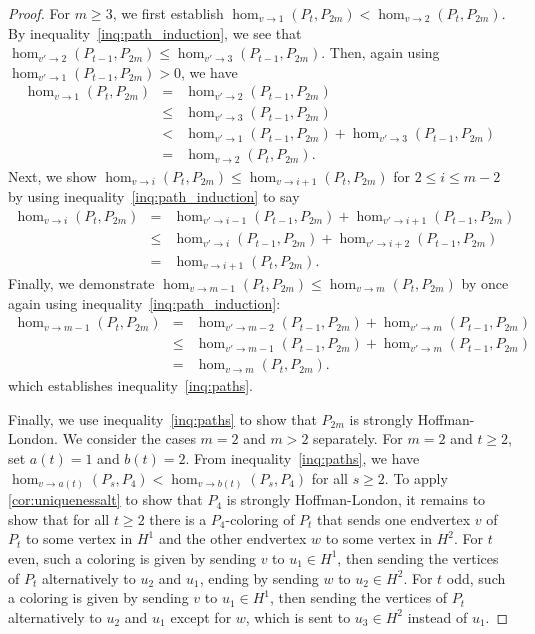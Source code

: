 \documentclass[11pt]{article}
\theoremstyle{definition}
\newcommand{\homclass}[4]{\hom_{#1\to#2}(#3,#4)}
\begin{document}
\begin{proof}
For $m \ge 3$, we first establish $\homclass{v}{1}{P_t}{P_{2m}} < \homclass{v}{2}{P_t}{P_{2m}}$. By inequality~\eqref{inq:path_induction}, we see that $\homclass{v'}{2}{P_{t-1}}{P_{2m}} \le \homclass{v'}{3}{P_{t-1}}{P_{2m}}$. Then, again using $\homclass{v'}{1}{P_{t-1}}{P_{2m}} > 0$, we have
\begin{eqnarray*}
\homclass{v}{1}{P_t}{P_{2m}} &=& \homclass{v'}{2}{P_{t-1}}{P_{2m}} \\
	&\le& \homclass{v'}{3}{P_{t-1}}{P_{2m}} \\
	&<& \homclass{v'}{1}{P_{t-1}}{P_{2m}} + \homclass{v'}{3}{P_{t-1}}{P_{2m}} \\
	&=& \homclass{v}{2}{P_t}{P_{2m}}.
\end{eqnarray*}
Next, we show $\homclass{v}{i}{P_t}{P_{2m}} \le \homclass{v}{i+1}{P_t}{P_{2m}}$ for $2 \le i \le m-2$ by using inequality~\eqref{inq:path_induction} to say
\begin{eqnarray*}
\homclass{v}{i}{P_t}{P_{2m}} &=& \homclass{v'}{i-1}{P_{t-1}}{P_{2m}} + \homclass{v'}{i+1}{P_{t-1}}{P_{2m}} \\
	&\le& \homclass{v'}{i}{P_{t-1}}{P_{2m}} + \homclass{v'}{i+2}{P_{t-1}}{P_{2m}} \\
	&=& \homclass{v}{i+1}{P_t}{P_{2m}}.
\end{eqnarray*}
Finally, we demonstrate $\homclass{v}{m-1}{P_t}{P_{2m}} \le \homclass{v}{m}{P_t}{P_{2m}}$ by once again using inequality~\eqref{inq:path_induction}:
\begin{eqnarray*}
\homclass{v}{m-1}{P_t}{P_{2m}} &=& \homclass{v'}{m-2}{P_{t-1}}{P_{2m}} + \homclass{v'}{m}{P_{t-1}}{P_{2m}} \\
	&\le& \homclass{v'}{m-1}{P_{t-1}}{P_{2m}} + \homclass{v'}{m}{P_{t-1}}{P_{2m}} \\
	&=& \homclass{v}{m}{P_t}{P_{2m}}.
\end{eqnarray*}
which establishes inequality~\eqref{inq:paths}.

Finally, we use inequality~\eqref{inq:paths} to show that $P_{2m}$ is strongly Hoffman-London. We consider the cases $m=2$ and $m > 2$ separately. For $m=2$ and $t \ge 2$, set $a(t)=1$ and $b(t)=2$. From inequality~\eqref{inq:paths}, we have $\homclass{v}{a(t)}{P_s}{P_{4}} < \homclass{v}{b(t)}{P_s}{P_{4}}$ for all $s \ge 2$. To apply \cref{cor:uniquenessalt} to show that $P_{4}$ is strongly Hoffman-London, it remains to show that for all $t \ge 2$ there is a $P_{4}$-coloring of $P_t$ that sends one endvertex $v$ of $P_t$ to some vertex in $H^1$ and the other endvertex $w$ to some vertex in $H^2$. For $t$ even, such a coloring is given by sending $v$ to $u_1\in H^1$, then sending the vertices of $P_t$ alternatively to $u_2$ and $u_1$, ending by sending $w$ to $u_2 \in H^2$. For $t$ odd, such a coloring is given by sending $v$ to $u_1\in H^1$, then sending the vertices of $P_t$ alternatively to $u_2$ and $u_1$ except for $w$, which is sent to $u_3 \in H^2$ instead of $u_1$.


\end{proof}
\end{document}
